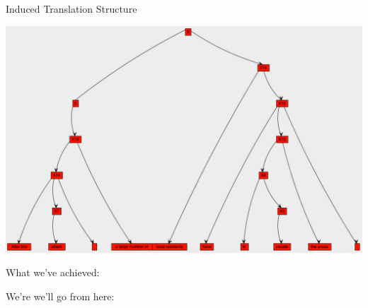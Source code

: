 \documentclass{beamer}
\newenvironment{unpacked_itemize}{
\begin{itemize}
  \setlength{\itemsep}{10pt}
  \setlength{\parskip}{0pt}
  \setlength{\parsep}{0pt}
}{\end{itemize}}
\begin{document}
\begin{frame}[t]{Induced Translation Structure}
\begin{center}
\includegraphics[scale=0.32]{joshua_tree19.pdf}
\end{center}
\end{frame}

\begin{frame}[t]{What we've achieved:}
  \vspace{0.5in}
  \begin{unpacked_itemize}
    \item 
    \item
  \end{unpacked_itemize}
\end{frame}


\begin{frame}[t]{We're we'll go from here:}
  \vspace{0.5in}
  \begin{unpacked_itemize}
    \item 
    \item 
  \end{unpacked_itemize}
\end{frame}
\end{document}
